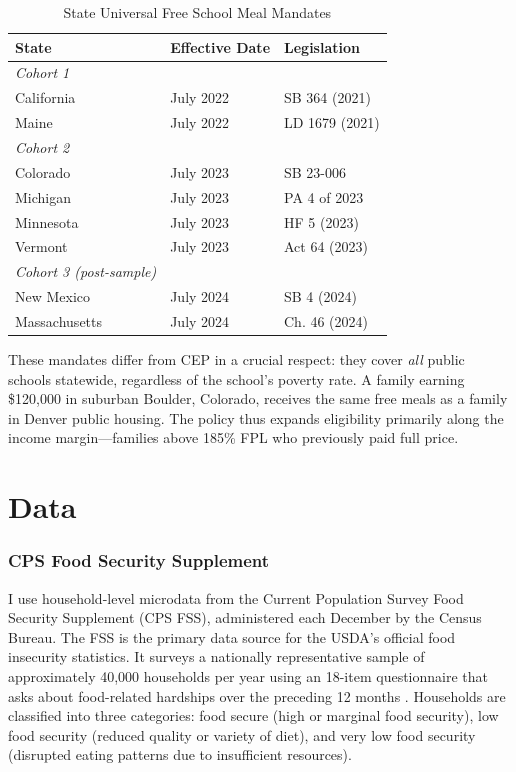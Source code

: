 \documentclass[12pt]{article}
\begin{document}
\begin{table}[H]
\centering
\caption{State Universal Free School Meal Mandates}
\label{tab:timing}
\begin{tabular}{lll}
\hline\hline
State & Effective Date & Legislation \\
\hline
\textit{Cohort 1} & & \\
\quad California & July 2022 & SB 364 (2021) \\
\quad Maine & July 2022 & LD 1679 (2021) \\
\addlinespace
\textit{Cohort 2} & & \\
\quad Colorado & July 2023 & SB 23-006 \\
\quad Michigan & July 2023 & PA 4 of 2023 \\
\quad Minnesota & July 2023 & HF 5 (2023) \\
\quad Vermont & July 2023 & Act 64 (2023) \\
\addlinespace
\textit{Cohort 3 (post-sample)} & & \\
\quad New Mexico & July 2024 & SB 4 (2024) \\
\quad Massachusetts & July 2024 & Ch. 46 (2024) \\
\hline
\end{tabular}
\end{table}

These mandates differ from CEP in a crucial respect: they cover \emph{all} public schools statewide, regardless of the school's poverty rate. A family earning \$120,000 in suburban Boulder, Colorado, receives the same free meals as a family in Denver public housing. The policy thus expands eligibility primarily along the income margin---families above 185\% FPL who previously paid full price.


\section{Data}
\label{sec:data}

\subsubsection*{CPS Food Security Supplement} I use household-level microdata from the Current Population Survey Food Security Supplement (CPS FSS), administered each December by the Census Bureau. The FSS is the primary data source for the USDA's official food insecurity statistics. It surveys a nationally representative sample of approximately 40,000 households per year using an 18-item questionnaire that asks about food-related hardships over the preceding 12 months \citep{nord2009food}. Households are classified into three categories: food secure (high or marginal food security), low food security (reduced quality or variety of diet), and very low food security (disrupted eating patterns due to insufficient resources).
\end{document}
